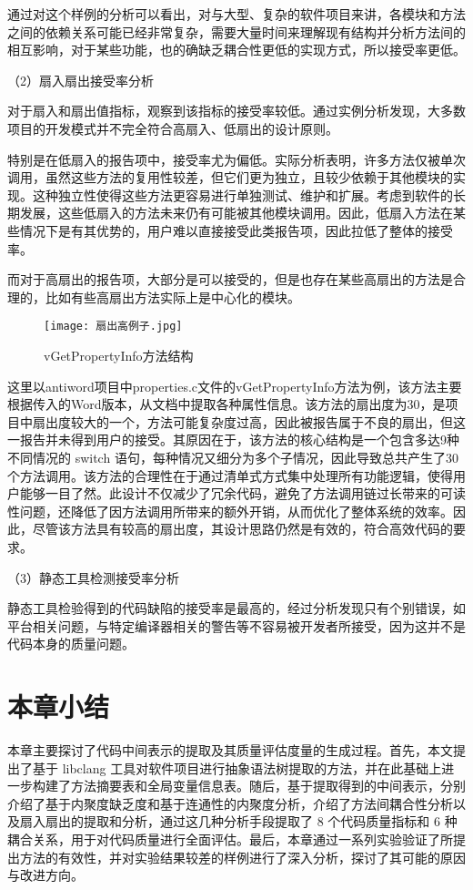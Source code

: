 通过对这个样例的分析可以看出，对与大型、复杂的软件项目来讲，各模块和方法之间的依赖关系可能已经非常复杂，需要大量时间来理解现有结构并分析方法间的相互影响，对于某些功能，也的确缺乏耦合性更低的实现方式，所以接受率更低。

（2）扇入扇出接受率分析

对于扇入和扇出值指标，观察到该指标的接受率较低。通过实例分析发现，大多数项目的开发模式并不完全符合高扇入、低扇出的设计原则。

特别是在低扇入的报告项中，接受率尤为偏低。实际分析表明，许多方法仅被单次调用，虽然这些方法的复用性较差，但它们更为独立，且较少依赖于其他模块的实现。这种独立性使得这些方法更容易进行单独测试、维护和扩展。考虑到软件的长期发展，这些低扇入的方法未来仍有可能被其他模块调用。因此，低扇入方法在某些情况下是有其优势的，用户难以直接接受此类报告项，因此拉低了整体的接受率。

而对于高扇出的报告项，大部分是可以接受的，但是也存在某些高扇出的方法是合理的，比如有些高扇出方法实际上是中心化的模块。

\begin{figure}[h]
\centering
\texttt{[image: 扇出高例子.jpg]}
\caption{vGetPropertyInfo方法结构}
\end{figure}
    

这里以antiword项目中properties.c文件的vGetPropertyInfo方法为例，该方法主要根据传入的Word版本，从文档中提取各种属性信息。该方法的扇出度为30，是项目中扇出度较大的一个，方法可能复杂度过高，因此被报告属于不良的扇出，但这一报告并未得到用户的接受。其原因在于，该方法的核心结构是一个包含多达9种不同情况的 switch 语句，每种情况又细分为多个子情况，因此导致总共产生了30个方法调用。该方法的合理性在于通过清单式方式集中处理所有功能逻辑，使得用户能够一目了然。此设计不仅减少了冗余代码，避免了方法调用链过长带来的可读性问题，还降低了因方法调用所带来的额外开销，从而优化了整体系统的效率。因此，尽管该方法具有较高的扇出度，其设计思路仍然是有效的，符合高效代码的要求。

（3）静态工具检测接受率分析

静态工具检验得到的代码缺陷的接受率是最高的，经过分析发现只有个别错误，如平台相关问题，与特定编译器相关的警告等不容易被开发者所接受，因为这并不是代码本身的质量问题。

\section{本章小结}

本章主要探讨了代码中间表示的提取及其质量评估度量的生成过程。首先，本文提出了基于 libclang 工具对软件项目进行抽象语法树提取的方法，并在此基础上进一步构建了方法摘要表和全局变量信息表。随后，基于提取得到的中间表示，分别介绍了基于内聚度缺乏度和基于连通性的内聚度分析，介绍了方法间耦合性分析以及扇入扇出的提取和分析，通过这几种分析手段提取了 8 个代码质量指标和 6 种耦合关系，用于对代码质量进行全面评估。最后，本章通过一系列实验验证了所提出方法的有效性，并对实验结果较差的样例进行了深入分析，探讨了其可能的原因与改进方向。

